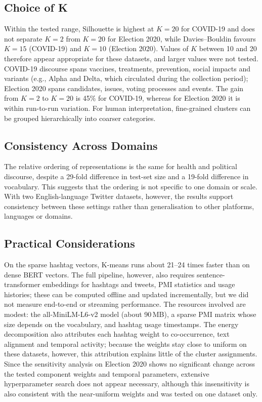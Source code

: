 \documentclass[pdflatex,sn-mathphys-num]{sn-jnl}%
\begin{document}
\subsection{Choice of K}\label{subsec26}

Within the tested range, Silhouette is highest at $K=20$ for COVID-19 and does not separate $K=2$ from $K=20$ for Election 2020, while Davies--Bouldin favours $K=15$ (COVID-19) and $K=10$ (Election 2020). Values of $K$ between 10 and 20 therefore appear appropriate for these datasets, and larger values were not tested. COVID-19 discourse spans vaccines, treatments, prevention, social impacts and variants (e.g., Alpha and Delta, which circulated during the collection period); Election 2020 spans candidates, issues, voting processes and events. The gain from $K=2$ to $K=20$ is 45\% for COVID-19, whereas for Election 2020 it is within run-to-run variation. For human interpretation, fine-grained clusters can be grouped hierarchically into coarser categories.

\subsection{Consistency Across Domains}\label{subsec27}

The relative ordering of representations is the same for health and political discourse, despite a 29-fold difference in test-set size and a 19-fold difference in vocabulary. This suggests that the ordering is not specific to one domain or scale. With two English-language Twitter datasets, however, the results support consistency between these settings rather than generalisation to other platforms, languages or domains.

\subsection{Practical Considerations}\label{subsec28}

On the sparse hashtag vectors, K-means runs about 21--24 times faster than on dense BERT vectors. The full pipeline, however, also requires sentence-transformer embeddings for hashtags and tweets, PMI statistics and usage histories; these can be computed offline and updated incrementally, but we did not measure end-to-end or streaming performance. The resources involved are modest: the all-MiniLM-L6-v2 model (about 90\,MB), a sparse PMI matrix whose size depends on the vocabulary, and hashtag usage timestamps. The energy decomposition also attributes each hashtag weight to co-occurrence, text alignment and temporal activity; because the weights stay close to uniform on these datasets, however, this attribution explains little of the cluster assignments. Since the sensitivity analysis on Election 2020 shows no significant change across the tested component weights and temporal parameters, extensive hyperparameter search does not appear necessary, although this insensitivity is also consistent with the near-uniform weights and was tested on one dataset only.
\end{document}
